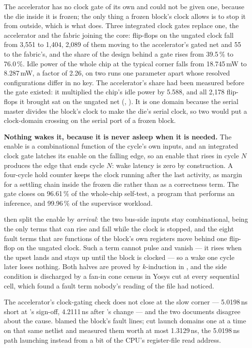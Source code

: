 The accelerator has no clock gate of its own and could not be given
one, because the die inside it is frozen; the only thing a frozen
block's clock allows is to stop it from outside, which is what
 does. Three integrated clock gates replace one, the
accelerator and the fabric joining the core: flip-flops on the ungated
clock fall from 3,551 to 1,404, 2,089 of them moving to the
accelerator's gated net and 55 to the fabric's, and the share of the
design behind a gate rises from 39.5\,\% to 76.0\,\%. Idle power of the
whole chip at the typical corner falls from 18.745\,mW to 8.287\,mW, a
factor of 2.26, on two runs one parameter apart whose resolved
configurations differ in no key. The accelerator's share had been
measured before the gate existed: it multiplied the chip's idle power
by 5.588, and all 2,178 flip-flops it brought sat on the ungated net
(, ). It is one domain
because the serial master divides the block's clock to make the die's
serial clock, so two would put a clock-domain crossing on the serial
port of a frozen block.

\textbf{Nothing wakes it, because it is never asleep when it is
needed.} The enable is a combinational function of the cycle's own
inputs, and an integrated clock gate latches its enable on the falling
edge, so an enable that rises in cycle $N$ produces the edge that ends
cycle $N$: wake latency is zero by construction. A four-cycle hold
counter keeps the clock running after the last activity, as margin for
a settling chain inside the frozen die rather than as a correctness
term. The gate closes on 96.61\,\% of the whole-chip self-test, a
program that performs an inference, and 99.96\,\% of the supervisor
workload.

 then split the enable by \emph{arrival}: the two bus-side
inputs stay combinational, being the only terms that can rise and fall
while the clock is stopped, and the eight fault terms that are
functions of the block's own registers move behind one flip-flop on the
ungated clock. Such a term cannot pulse and vanish --- it rises when
the upset lands and stays up until the block is clocked --- so a wake
one cycle later loses nothing. Both halves are proved by $k$-induction
in , and the side
condition is discharged by a fan-in cone census in Yosys cut at every
sequential cell, which found a fault term nobody's reading of the file
had noticed.

The accelerator's clock-gating check does not close at the slow corner
--- 5.0198\,ns short at 's sign-off, 4.2111\,ns after
's change --- and the two documents disagree about the
cause.  blamed the block's fault lines;  cut
launch domains one at a time on that same netlist and measured them
worth at most 1.3129\,ns, the 5.0198\,ns path launching instead from a
bit of the CPU's register-file read address.

